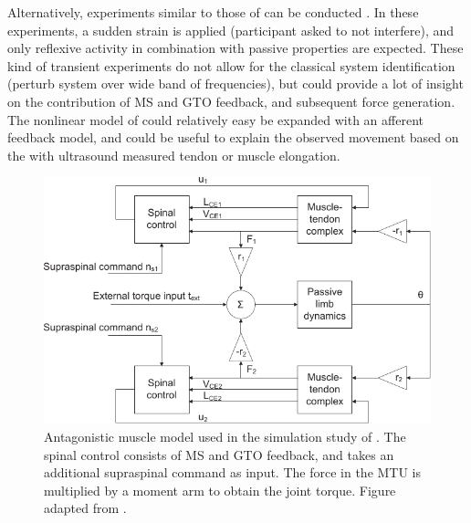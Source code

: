 Alternatively, experiments similar to those of \citeauthor{de_gooijer-van_de_groep_estimation_2016} can be conducted \cite{de_gooijer-van_de_groep_estimation_2016}. In these experiments, a sudden strain is applied (participant asked to not interfere), and only reflexive activity in combination with passive properties are expected. These kind of transient experiments do not allow for the classical system identification (perturb system over wide band of frequencies), but could provide a lot of insight on the contribution of MS and GTO feedback, and subsequent force generation. The nonlinear model of \cite{de_gooijer-van_de_groep_estimation_2016} could relatively easy be expanded with an afferent feedback model, and could be useful to explain the observed movement based on the with ultrasound measured tendon or muscle elongation. 


\begin{figure}[t]
	\centering
	\includegraphics[width=.8\linewidth]{Figures/elastography/mugge_antagonistic.pdf}
	\caption{Antagonistic muscle model used in the simulation study of \citeauthor{mugge_modeling_2012}. The spinal control consists of MS and GTO feedback, and takes an additional supraspinal command as input. The force in the MTU is multiplied by a moment arm to obtain the joint torque. Figure adapted from \citet{mugge_modeling_2012}.}
	\label{fig:mugge_antagonistic}
\end{figure}


